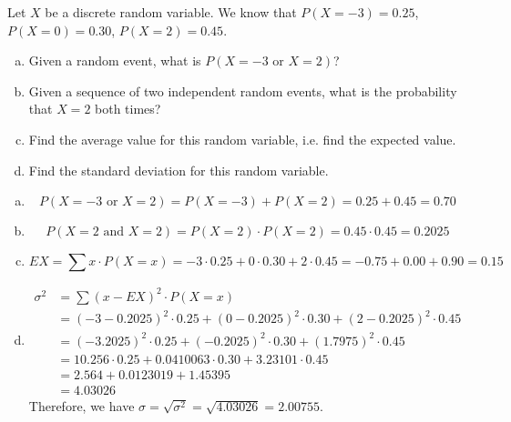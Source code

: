 \documentclass[11pt,letterpaper]{article}
\begin{document}

 Let $X$ be a discrete random variable. We know that $P(X= -3)= 0.25$, $P(X= 0)= 0.30$, $P(X= 2)= 0.45$. 
	\begin{enumerate}[(a)]
	\item Given a random event, what is $P(X= -3 \text{ or } X= 2)$?
	\item Given a sequence of two independent random events, what is the probability that $X= 2$ both times?
	\item Find the average value for this random variable, i.e. find the expected value.
	\item Find the standard deviation for this random variable. 
	\end{enumerate} \pspace

\sol 
\begin{enumerate}[(a)]
\item 
	\[
	P(X= -3 \text{ or } X= 2)= P(X= -3) + P(X= 2)= 0.25 + 0.45= 0.70
	\] \pspace

\item 
	\[
	P(X= 2 \text{ and } X= 2)= P(X= 2) \cdot P(X= 2)= 0.45 \cdot 0.45= 0.2025
	\] \pspace

\item 
	\[
	EX= \sum x \cdot P(X= x)= -3 \cdot 0.25 + 0 \cdot 0.30 + 2 \cdot 0.45= -0.75 + 0.00 + 0.90= 0.15
	\] \pspace

\item 
	\[
	\begin{aligned}
	\sigma^2&= \sum (x - EX)^2 \cdot P(X= x) \\[0.3cm]
	&= (-3 - 0.2025)^2 \cdot 0.25 + (0 - 0.2025)^2 \cdot 0.30 + (2 - 0.2025)^2 \cdot 0.45 \\[0.3cm]
	&= (-3.2025)^2 \cdot 0.25 + (-0.2025)^2 \cdot 0.30 + (1.7975)^2 \cdot 0.45 \\[0.3cm]
	&= 10.256 \cdot 0.25 + 0.0410063 \cdot 0.30 + 3.23101 \cdot 0.45 \\[0.3cm]
	&= 2.564 + 0.0123019 + 1.45395 \\[0.3cm]
	&= 4.03026
	\end{aligned}
	\]
Therefore, we have $\sigma = \sqrt{\sigma^2}= \sqrt{4.03026}= 2.00755$. 
\end{enumerate}



\newpage
\end{document}
